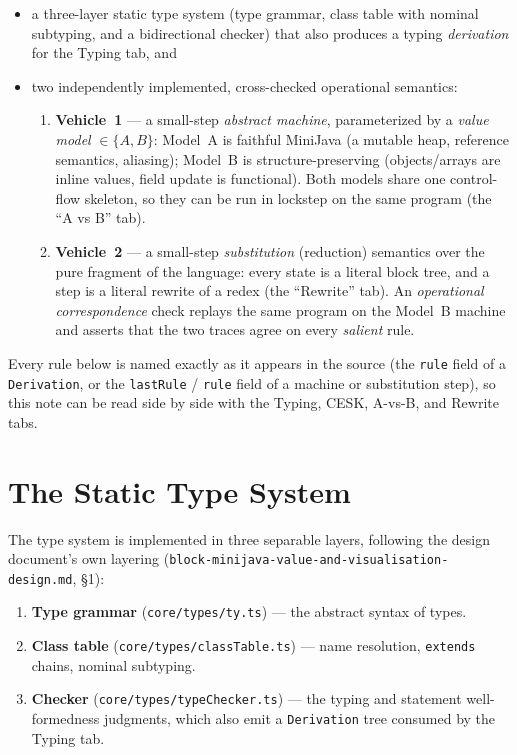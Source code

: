 \documentclass[11pt]{article}
\begin{document}
\begin{itemize}
  \item a three-layer static type system (type grammar, class table with
        nominal subtyping, and a bidirectional checker) that also produces a
        typing \emph{derivation} for the Typing tab, and
  \item two independently implemented, cross-checked operational semantics:
  \begin{enumerate}
    \item \textbf{Vehicle~1} --- a small-step \emph{abstract machine},
          parameterized by a \emph{value model} $\in \{A, B\}$: Model~A is
          faithful MiniJava (a mutable heap, reference semantics, aliasing);
          Model~B is structure-preserving (objects/arrays are inline values,
          field update is functional). Both models share one control-flow
          skeleton, so they can be run in lockstep on the same program (the
          ``A vs B'' tab).
    \item \textbf{Vehicle~2} --- a small-step \emph{substitution} (reduction)
          semantics over the pure fragment of the language: every state is a
          literal block tree, and a step is a literal rewrite of a redex (the
          ``Rewrite'' tab). An \emph{operational correspondence} check
          replays the same program on the Model~B machine and asserts that
          the two traces agree on every \emph{salient} rule.
  \end{enumerate}
\end{itemize}

Every rule below is named exactly as it appears in the source (the
\texttt{rule} field of a \texttt{Derivation}, or the \texttt{lastRule} /
\texttt{rule} field of a machine or substitution step), so this note can be
read side by side with the Typing, CESK, A-vs-B, and Rewrite tabs.

\section{The Static Type System}
\label{sec:types}

The type system is implemented in three separable layers, following the
design document's own layering (\texttt{block-minijava-value-and-visualisation-design.md},
\S1):

\begin{enumerate}
  \item \textbf{Type grammar} (\texttt{core/types/ty.ts}) --- the abstract
        syntax of types.
  \item \textbf{Class table} (\texttt{core/types/classTable.ts}) --- name
        resolution, \texttt{extends} chains, nominal subtyping.
  \item \textbf{Checker} (\texttt{core/types/typeChecker.ts}) --- the typing
        and statement well-formedness judgments, which also emit a
        \texttt{Derivation} tree consumed by the Typing tab.
\end{enumerate}
\end{document}

